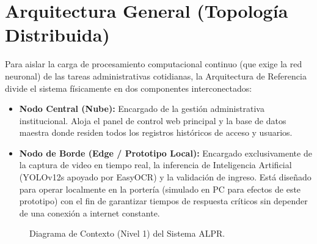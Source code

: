 \section{Arquitectura General (Topología Distribuida)}

Para aislar la carga de procesamiento computacional continuo (que exige la red neuronal) de las tareas administrativas cotidianas, la Arquitectura de Referencia divide el sistema físicamente en dos componentes interconectados:

\begin{itemize}
    \item \textbf{Nodo Central (Nube):} Encargado de la gestión administrativa institucional. Aloja el panel de control web principal y la base de datos maestra donde residen todos los registros históricos de acceso y usuarios.
    \item \textbf{Nodo de Borde (Edge / Prototipo Local):} Encargado exclusivamente de la captura de video en tiempo real, la inferencia de Inteligencia Artificial (YOLOv12s apoyado por EasyOCR) y la validación de ingreso. Está diseñado para operar localmente en la portería (simulado en PC para efectos de este prototipo) con el fin de garantizar tiempos de respuesta críticos sin depender de una conexión a internet constante.
\end{itemize}

\vspace{1cm}
\begin{figure}[H]
\centering
{}
\caption{Diagrama de Contexto (Nivel 1) del Sistema ALPR.}
\label{fig:c1_contexto}
\end{figure}


